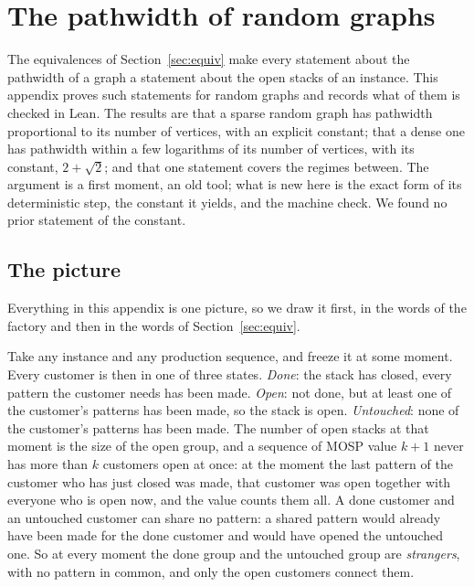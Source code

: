 \section{The pathwidth of random graphs}
\label{app:random}

The equivalences of Section~\ref{sec:equiv} make every statement about the
pathwidth of a graph a statement about the open stacks of an instance. This
appendix proves such statements for random graphs and records what of them is
checked in Lean. The results are that a sparse random graph has pathwidth
proportional to its number of vertices, with an explicit constant; that a
dense one has pathwidth within a few logarithms of its number of vertices,
with its constant, $2+\sqrt2$; and that one statement covers the regimes between. The argument is a first moment, an old tool; what is new here is the
exact form of its deterministic step, the constant it yields, and the
machine check. We found no prior statement of the constant.

\subsection{The picture}
\label{app:random-picture}

Everything in this appendix is one picture, so we draw it first, in the words
of the factory and then in the words of Section~\ref{sec:equiv}.

Take any instance and any production sequence, and freeze it at some moment.
Every customer is then in one of three states. \emph{Done}: the stack has
closed, every pattern the customer needs has been made. \emph{Open}: not done,
but at least one of the customer's patterns has been made, so the stack is
open. \emph{Untouched}: none of the customer's patterns has been made. The
number of open stacks at that moment is the size of the open group, and a
sequence of MOSP value $k+1$ never has more than $k$ customers open at once:
at the moment the last pattern of the customer who has just closed was made,
that customer was open together with everyone who is open now, and the value
counts them all. A
done customer and an untouched customer can share no pattern: a shared pattern
would already have been made for the done customer and would have opened the
untouched one. So at every moment the done group and the untouched group are
\emph{strangers}, with no pattern in common, and only the open customers
connect them.

